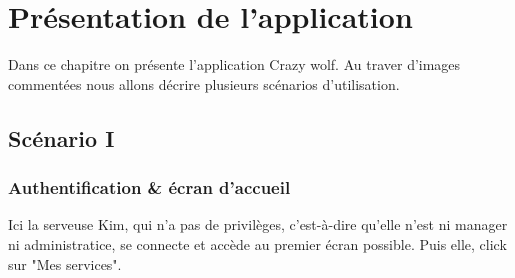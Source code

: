 \chapter[L'application]{Présentation de l'application}

Dans ce chapitre on présente l'application Crazy wolf. 
Au traver d'images commentées nous allons décrire plusieurs scénarios
d'utilisation.
\section{Scénario I}
\subsection*{Authentification \& écran d'accueil}
Ici la serveuse Kim, qui n'a pas de privilèges, c'est-à-dire qu'elle n'est 
ni manager ni administratice, se connecte et accède au premier écran possible.
Puis elle, click sur "Mes services".

